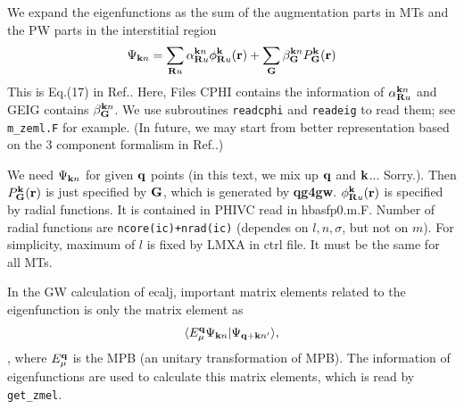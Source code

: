 \documentclass[a4paper,10pt,fleqn]{article}
\newcommand{\bfq}{{\bf q}}
\newcommand{\bfk}{{\bf k}}
\newcommand{\bfG}{{\bf G}}
\newcommand{\exe}[1]{{\bf #1}}
\newcommand{\io}[1]{{\sf  #1}}
\begin{document}
We expand the eigenfunctions as the sum of the augmentation parts in MTs and the PW parts in the interstitial region
\begin{eqnarray}
\Psi_{{\bf k}n} = \sum_{{\bf R}u}\alpha_{{\bf R}u}^{{\bf k}n}\phi_{{\bf R}u}^{\bf k}({\bf r}) + \sum_{\bf G}\beta_{\bf G}^{{\bf k}n}P_{\bf G}^{\bf k}({\bf r})
\end{eqnarray}
This is Eq.(17) in Ref.\cite{kotani_quasiparticle_2014}.
Here, Files \io{CPHI} contains the information of $\alpha_{{\bf R}u}^{{\bf k}n}$ and \io{GEIG} contains $\beta_{\bf G}^{{\bf k}n}$. 
We use subroutines \verb#readcphi# and \verb#readeig# to
read them; see \verb#m_zeml.F# for example.
(In future, we may start from better representation
based on the 3 component formalism in Ref.\cite{kotani2015pmt}.)

We need $\Psi_{{\bf k}n}$ for given $\bfq$ points 
(in this text, we mix up $\bfq$ and $\bfk$... Sorry.).
Then $P_{\bf G}^{\bf k}({\bf r})$ is just specified by 
$\bfG$, which is generated by \exe{qg4gw}.
$\phi_{{\bf R}u}^{\bf k}({\bf r})$ is specified by
radial functions. It is contained in \io{PHIVC} read in hbasfp0.m.F. Number of radial functions are
\verb#ncore(ic)+nrad(ic)# 
(dependes on $l,n,\sigma$, but not on $m$).
For simplicity, maximum of $l$ is fixed by LMXA in ctrl file.
It must be the same for all MTs.

In the GW calculation of ecalj, important matrix elements related
to the eigenfunction is only the matrix element as
\begin{eqnarray}
\langle E^{\bf q}_\mu \Psi_{{\bf k}n} |\Psi_{{\bf q+k}n'} \rangle,
\end{eqnarray}
, where $E^{\bf q}_\mu$ is the MPB (an unitary transformation of MPB).
The information of eigenfunctions are used to calculate this matrix elements, which is read by \verb#get_zmel#.


\end{document}
